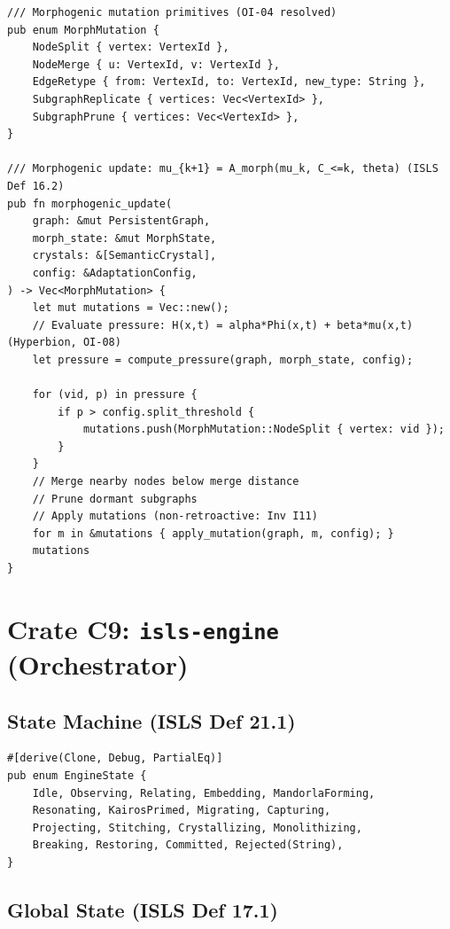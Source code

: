 \documentclass[10pt,a4paper]{article}
\theoremstyle{definition}\newtheorem{definition}{Def}[section]
\theoremstyle{plain}\newtheorem{theorem}{Thm}[section]
\newcommand{\crate}[1]{\texttt{\small\color{rustborder!80!black}#1}}
\begin{document}
\begin{lstlisting}[style=rust]
/// Morphogenic mutation primitives (OI-04 resolved)
pub enum MorphMutation {
    NodeSplit { vertex: VertexId },
    NodeMerge { u: VertexId, v: VertexId },
    EdgeRetype { from: VertexId, to: VertexId, new_type: String },
    SubgraphReplicate { vertices: Vec<VertexId> },
    SubgraphPrune { vertices: Vec<VertexId> },
}

/// Morphogenic update: mu_{k+1} = A_morph(mu_k, C_<=k, theta) (ISLS Def 16.2)
pub fn morphogenic_update(
    graph: &mut PersistentGraph,
    morph_state: &mut MorphState,
    crystals: &[SemanticCrystal],
    config: &AdaptationConfig,
) -> Vec<MorphMutation> {
    let mut mutations = Vec::new();
    // Evaluate pressure: H(x,t) = alpha*Phi(x,t) + beta*mu(x,t) (Hyperbion, OI-08)
    let pressure = compute_pressure(graph, morph_state, config);

    for (vid, p) in pressure {
        if p > config.split_threshold {
            mutations.push(MorphMutation::NodeSplit { vertex: vid });
        }
    }
    // Merge nearby nodes below merge distance
    // Prune dormant subgraphs
    // Apply mutations (non-retroactive: Inv I11)
    for m in &mutations { apply_mutation(graph, m, config); }
    mutations
}
\end{lstlisting}

\section{Crate C9: \crate{isls-engine} (Orchestrator)}
\label{sec:c9}

\subsection{State Machine (ISLS Def 21.1)}

\begin{lstlisting}[style=rust]
#[derive(Clone, Debug, PartialEq)]
pub enum EngineState {
    Idle, Observing, Relating, Embedding, MandorlaForming,
    Resonating, KairosPrimed, Migrating, Capturing,
    Projecting, Stitching, Crystallizing, Monolithizing,
    Breaking, Restoring, Committed, Rejected(String),
}
\end{lstlisting}

\subsection{Global State (ISLS Def 17.1)}
\end{document}
